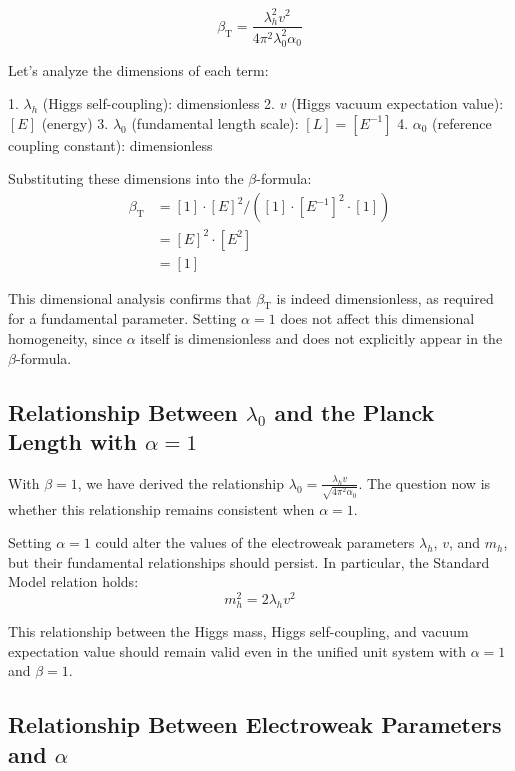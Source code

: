 \documentclass[12pt,a4paper]{article}
\newcommand{\betaT}{\beta_{\text{T}}}
\begin{document}
	\begin{equation}
		\betaT = \frac{\lambda_h^2 v^2}{4\pi^2 \lambda_0^2 \alpha_0}
	\end{equation}
	
	Let's analyze the dimensions of each term:
	
	1. \(\lambda_h\) (Higgs self-coupling): dimensionless
	2. \(v\) (Higgs vacuum expectation value): \([E]\) (energy)
	3. \(\lambda_0\) (fundamental length scale): \([L] = [E^{-1}]\)
	4. \(\alpha_0\) (reference coupling constant): dimensionless
	
	Substituting these dimensions into the \(\beta\)-formula:
	\begin{align}
		\betaT &= [1] \cdot [E]^2 / ([1] \cdot [E^{-1}]^2 \cdot [1]) \\
		&= [E]^2 \cdot [E^{2}] \\
		&= [1]
	\end{align}
	
	This dimensional analysis confirms that \(\betaT\) is indeed dimensionless, as required for a fundamental parameter. Setting \(\alpha = 1\) does not affect this dimensional homogeneity, since \(\alpha\) itself is dimensionless and does not explicitly appear in the \(\beta\)-formula.
	
	\subsection{Relationship Between \(\lambda_0\) and the Planck Length with \(\alpha = 1\)}
	
	With \(\beta = 1\), we have derived the relationship \(\lambda_0 = \frac{\lambda_h v}{\sqrt{4\pi^2 \alpha_0}}\). The question now is whether this relationship remains consistent when \(\alpha = 1\).
	
	Setting \(\alpha = 1\) could alter the values of the electroweak parameters \(\lambda_h\), \(v\), and \(m_h\), but their fundamental relationships should persist. In particular, the Standard Model relation holds:
	\begin{equation}
		m_h^2 = 2\lambda_h v^2
	\end{equation}
	
	This relationship between the Higgs mass, Higgs self-coupling, and vacuum expectation value should remain valid even in the unified unit system with \(\alpha = 1\) and \(\beta = 1\).
	
	\subsection{Relationship Between Electroweak Parameters and \(\alpha\)}
	
\end{document}
